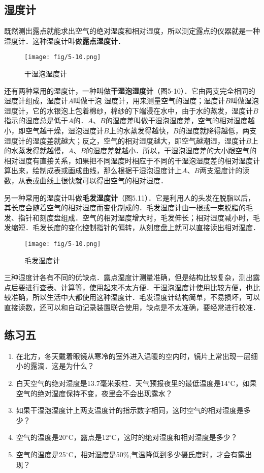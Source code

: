 \subsection{湿度计} 
既然测出露点就能求出空气的绝对湿度和相对湿度，所以测定露点的仪器就是一种湿度计．这种湿度计叫做\textbf{露点湿度计}．
\begin{figure}[htp]
\centering
\texttt{[image: fig/5-10.png]}
\caption{干湿泡湿度计}
\end{figure}

还有两种常用的湿度计，一种叫做\textbf{干湿泡湿度计}（图5-10）．它由两支完全相同的湿度计组成，湿度计$A$叫做干泡
湿度计，用来测量空气的湿度；湿度计$B$叫做湿泡湿度计，它的水银泡上包着棉纱，棉纱的下端浸在水中，由于水的蒸发，湿度计$B$指示的湿度总是低于$A$的．$A$、$B$的湿度差叫做干湿泡湿度差，空气的相对湿度越小，即空气越干燥，湿泡湿度计$B$上的水蒸发得越快，$B$的湿度就降得越低，两支湿度计的湿度差就越大；反之，空气的相对湿度越大，即空气越潮湿，湿度计$B$上的水蒸发得就越慢，$A$、$B$的湿度差就越小．所以，干湿泡湿度差的大小跟空气的相对湿度有直接关系，如果把不同湿度时相应于不同的干湿泡湿度差的相对湿度计算出来，绘制成表或画成曲线，那么根据干湿泡湿度计上$A$、$B$两支湿度计的读数，从表或曲线上很快就可以得出空气的相对湿度．

另一种常用的湿度计叫做\textbf{毛发湿度计}（图5.11）．它是利用人的头发在脱脂以后，其长度会随着空气的相对湿度而变化制成的．毛发湿度计由一根或一束脱脂的毛发、指针和刻度盘组成．空气的相对湿度增大时，毛发伸长；相对湿度减小时，毛发缩短．毛发长度的变化控制指针的偏转，从刻度盘上就可以直接读出相对湿度．
\begin{figure}[htp]
\centering
\texttt{[image: fig/5-10.png]}
\caption{毛发湿度计}
\end{figure}

三种湿度计各有不同的优缺点．露点湿度计测量准确，但是结构比较复杂，测出露点后要进行查表、计算等，使用起来不太方便．干湿泡湿度计使用比较方便，也比较准确，所以生活中大都使用这种湿度计．毛发湿度计结构简单，不易损坏，可以直接读数，还可以和自动记录装置联合使用，缺点是不太准确，要经常进行校准．

\subsection*{练习五}

\begin{enumerate}
	\item 在北方，冬天戴着眼镜从寒冷的室外进入温暖的空内时，镜片上常出现一层细小的露滴．这是为什么？
\item 白天空气的绝对湿度是13.7毫米汞柱．天气预报夜里的最低温度是14$^\circ$C，如果空气的绝对湿度保持不变，夜里会不会出现露水？
\item 如果干湿泡湿度计上两支温度计的指示数字相同，这时空气的相对湿度是多少？
\item 空气的温度是20$^\circ$C，露点是12$^\circ$C，这时的绝对湿度和相对湿度是多少？
\item 空气的温度是25$^\circ$C，相对湿度是50\%,气温降低到多少摄氏度时，才会有露出现？
\end{enumerate}

